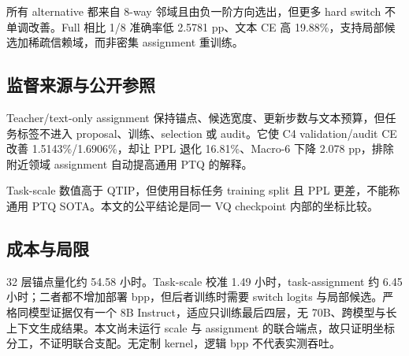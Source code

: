 所有 alternative 都来自 8-way 邻域且由负一阶方向选出，但更多 hard switch 不单调改善。Full 相比 1/8 准确率低 2.5781 pp、文本 CE 高 19.88\%，支持局部候选加稀疏信赖域，而非密集 assignment 重训练。

\subsection{监督来源与公开参照}

Teacher/text-only assignment 保持锚点、候选宽度、更新步数与文本预算，但任务标签不进入 proposal、训练、selection 或 audit。它使 C4 validation/audit CE 改善 1.5143\%/1.6906\%，却让 PPL 退化 16.81\%、Macro-6 下降 2.078 pp，排除附近领域 assignment 自动提高通用 PTQ 的解释。

\begin{table}[t]
\centering
\caption{监督不同，仅作质量坐标参照。}
\label{tab:reference_v8}
\end{table}

Task-scale 数值高于 QTIP，但使用目标任务 training split 且 PPL 更差，不能称通用 PTQ SOTA。本文的公平结论是同一 VQ checkpoint 内部的坐标比较。

\subsection{成本与局限}

32 层锚点量化约 54.58 小时。Task-scale 校准 1.49 小时，task-assignment 约 6.45 小时；二者都不增加部署 bpp，但后者训练时需要 switch logits 与局部候选。严格同模型证据仅有一个 8B Instruct，适应只训练最后四层，无 70B、跨模型与长上下文生成结果。本文尚未运行 scale 与 assignment 的联合端点，故只证明坐标分工，不证明联合支配。无定制 kernel，逻辑 bpp 不代表实测吞吐。

